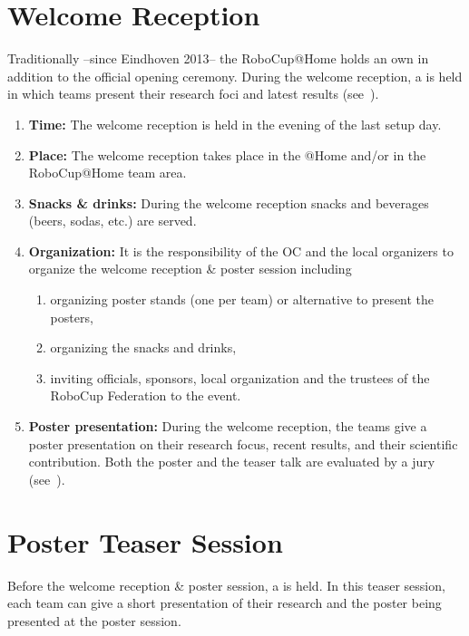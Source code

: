 \section{Welcome Reception}
\label{sec:welcome_reception}
Traditionally --since Eindhoven 2013-- the RoboCup@Home holds an own  in addition to the official opening ceremony. During the welcome reception, a  is held in which teams present their research foci and latest results (see~).
\begin{enumerate}
	\item \textbf{Time:} The welcome reception is held in the evening of the last setup day.
	\item \textbf{Place:} The welcome reception takes place in the @Home \Arena{} and/or in the RoboCup@Home team area.
	\item \textbf{Snacks \& drinks:} During the welcome reception snacks and beverages (beers, sodas, etc.) are served.
	\item \textbf{Organization:} It is the responsibility of the OC and the local organizers to organize the welcome reception \& poster session including
		\begin{enumerate}
			\item organizing poster stands (one per team) or alternative to present the posters,
			\item organizing the snacks and drinks,
			\item inviting officials, sponsors, local organization and the trustees of the RoboCup Federation to the event.
		\end{enumerate}
	\item \textbf{Poster presentation:} During the welcome reception, the teams give a poster presentation on their research focus, recent results, and their scientific contribution.
	Both the poster and the teaser talk are evaluated by a jury (see~).
\end{enumerate}

\section{Poster Teaser Session}
\label{sec:poster_teaser_session}
Before the welcome reception \& poster session, a  is held. In this teaser session, each team can give a short presentation of their research and the poster being presented at the poster session.

